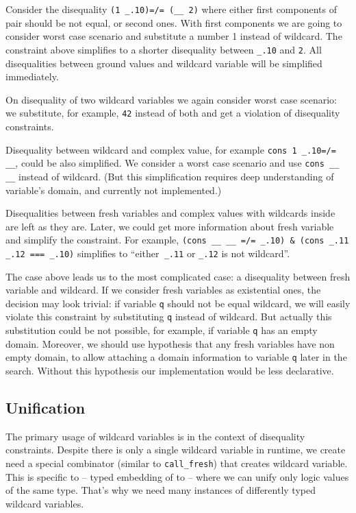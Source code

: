 Consider the disequality \lstinline|(1 _.10)=/= (__ 2)| where either first components of pair should be not equal, or second ones. With first components we are going to consider worst case scenario and substitute a number 1 instead of wildcard. The constraint above simplifies to a shorter disequality between  \lstinline|_.10| and \lstinline|2|. All disequalities between ground values and wildcard variable will be simplified immediately.

On disequality of two wildcard variables we again consider worst case scenario: we substitute, for example, \lstinline|42| instead of both and get a violation of disequality constraints.

Disequality between wildcard and complex value, for example  \lstinline|cons 1 _.10=/= __|, could be also simplified. We consider a worst case scenario and use \lstinline|cons __ __| instead of wildcard. (But this simplification requires deep understanding of variable's domain, and currently not implemented.)

Disequalities between fresh variables and complex values with wildcards inside are left as they are. Later, we could get more information  about fresh variable and simplify the constraint. For example,
 \lstinline|(cons __ __ =/= _.10) & (cons _.11 _.12 === _.10)| simplifies to ``either\lstinline| _.11|  or \lstinline|_.12| is not wildcard''.

The case above leads us to the most complicated case: a disequality between fresh variable and wildcard. If we consider fresh variables as existential ones, the decision may look trivial: if variable \lstinline|q| should not be equal wildcard, we will easily violate this constraint by substituting \lstinline|q| instead of wildcard. But actually this substitution could be not possible, for example, if variable \lstinline|q| has an empty domain. Moreover, we should use hypothesis that any fresh variables have non empty domain, to allow attaching a domain information to variable \lstinline|q| later in the search. Without this hypothesis our \miniKanren{} implementation would be less declarative.



\subsection{Unification}
The primary usage of wildcard variables is in the context of disequality constraints. Despite there is only a single wildcard variable in runtime, we create need a special combinator (similar to \lstinline|call_fresh|) that creates wildcard variable. This is specific to \OCanren{} -- typed embedding of \miniKanren{} to \OCaml{} -- where we can unify only logic values of the same type. That's why we need many instances of differently typed wildcard variables.

